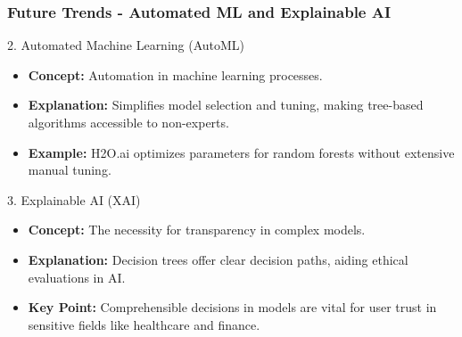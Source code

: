 \documentclass[aspectratio=169]{beamer}
\begin{document}
\begin{frame}[fragile]
  \frametitle{Future Trends - Automated ML and Explainable AI}
  \begin{block}{2. Automated Machine Learning (AutoML)}
    \begin{itemize}
      \item \textbf{Concept:} Automation in machine learning processes.
      \item \textbf{Explanation:} Simplifies model selection and tuning, making tree-based algorithms accessible to non-experts.
      \item \textbf{Example:} H2O.ai optimizes parameters for random forests without extensive manual tuning.
    \end{itemize}
  \end{block}

  \begin{block}{3. Explainable AI (XAI)}
    \begin{itemize}
      \item \textbf{Concept:} The necessity for transparency in complex models.
      \item \textbf{Explanation:} Decision trees offer clear decision paths, aiding ethical evaluations in AI.
      \item \textbf{Key Point:} Comprehensible decisions in models are vital for user trust in sensitive fields like healthcare and finance.
    \end{itemize}
  \end{block}
\end{frame}
\end{document}
